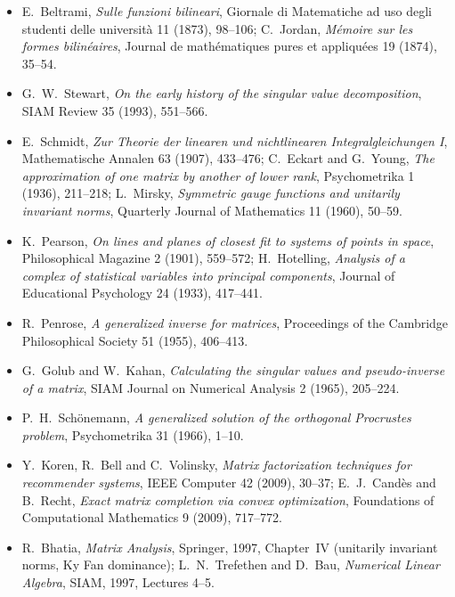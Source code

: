 \begin{itemize}
\item E.~Beltrami, \emph{Sulle funzioni bilineari}, Giornale di Matematiche ad uso degli studenti delle universit\`a 11
(1873), 98--106; C.~Jordan, \emph{M\'emoire sur les formes bilin\'eaires}, Journal de math\'ematiques pures et appliqu\'ees
19 (1874), 35--54.
\item G.~W.~Stewart, \emph{On the early history of the singular value decomposition}, SIAM Review 35 (1993), 551--566.
\item E.~Schmidt, \emph{Zur Theorie der linearen und nichtlinearen Integralgleichungen I}, Mathematische Annalen 63 (1907),
433--476; C.~Eckart and G.~Young, \emph{The approximation of one matrix by another of lower rank}, Psychometrika 1 (1936),
211--218; L.~Mirsky, \emph{Symmetric gauge functions and unitarily invariant norms}, Quarterly Journal of Mathematics 11
(1960), 50--59.
\item K.~Pearson, \emph{On lines and planes of closest fit to systems of points in space}, Philosophical Magazine 2 (1901),
559--572; H.~Hotelling, \emph{Analysis of a complex of statistical variables into principal components}, Journal of
Educational Psychology 24 (1933), 417--441.
\item R.~Penrose, \emph{A generalized inverse for matrices}, Proceedings of the Cambridge Philosophical Society 51 (1955),
406--413.
\item G.~Golub and W.~Kahan, \emph{Calculating the singular values and pseudo-inverse of a matrix}, SIAM Journal on
Numerical Analysis 2 (1965), 205--224.
\item P.~H.~Sch\"onemann, \emph{A generalized solution of the orthogonal Procrustes problem}, Psychometrika 31 (1966), 1--10.
\item Y.~Koren, R.~Bell and C.~Volinsky, \emph{Matrix factorization techniques for recommender systems}, IEEE Computer 42
(2009), 30--37; E.~J.~Cand\`es and B.~Recht, \emph{Exact matrix completion via convex optimization}, Foundations of
Computational Mathematics 9 (2009), 717--772.
\item R.~Bhatia, \emph{Matrix Analysis}, Springer, 1997, Chapter~IV (unitarily invariant norms, Ky Fan dominance); L.~N.~Trefethen
and D.~Bau, \emph{Numerical Linear Algebra}, SIAM, 1997, Lectures 4--5.
\end{itemize}

